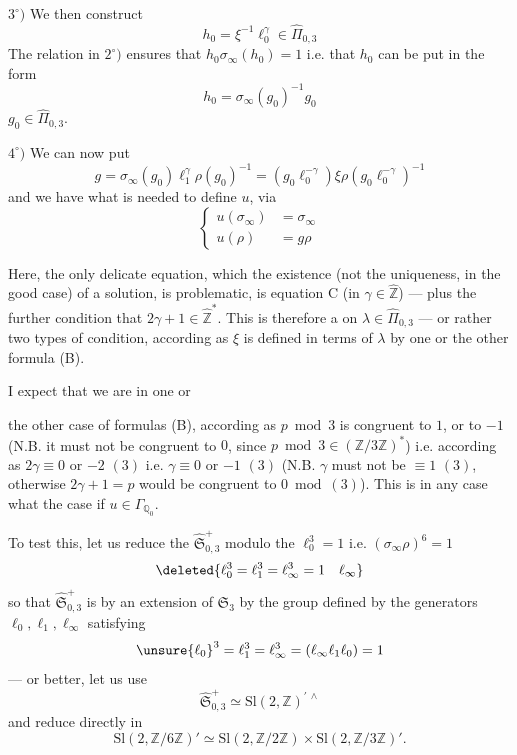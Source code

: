 
$3^\circ)$ We then construct
\[
h_0=\xi^{-1}\ell_0^{\gamma}
\in\widehat{\Pi}_{0,3}
\]
The relation in $2^\circ)$ ensures that $h_0\sigma_\infty(h_0)=1$ i.e.
that $h_0$ can be put in the form
\[
h_0=\sigma_\infty(g_0)^{-1}g_0
\]
 $g_0\in\widehat{\Pi}_{0,3}$.


$4^\circ)$ We can now put
\[
g=\sigma_\infty(g_0)\ell_1^{\gamma}\rho(g_0)^{-1}
=(g_0\ell_0^{-\gamma})\xi
\rho(g_0\ell_0^{-\gamma})^{-1}
\]
and we  have what is needed to define $u$, via
\[
\left\{
\begin{aligned}
u(\sigma_\infty)&=\sigma_\infty\\
u(\rho)&=g\rho
\end{aligned}
\right.
\]

Here, the only delicate equation,  which
the existence (not the uniqueness, in the good case) of a solution, is problematic,
is equation C (in $\gamma\in\widehat{\mathbb Z}$)
--- plus the further condition that $2\gamma+1\in\widehat{\mathbb Z}^{*}$.
This is therefore a 
on $\lambda\in\widehat{\Pi}_{0,3}$ --- or rather two types of condition,
according as $\xi$ is defined in terms of $\lambda$ by
one or the other formula (B).

I expect that we are in one or



the other case of formulas (B), according as $p\bmod 3$ is congruent to $1$, or to $-1$
(N.B. it must not be congruent to $0$, since $p\bmod 3\in(\mathbb Z/3\mathbb Z)^*$)
i.e. according as $2\gamma\equiv 0$ or $-2$ $(3)$ i.e.
$\gamma\equiv 0$ or $-1$ $(3)$
(N.B. $\gamma$ must not be $\equiv 1$ $(3)$,
otherwise $2\gamma+1=p$ would be congruent to $0\bmod(3)$).
This is in any case what  the case if $u\in\Gamma_{\mathbb Q_0}$.

To test this, let us reduce the 
$\widehat{\mathfrak S}_{0,3}^{+}$
modulo the 
$\ell_0^3=1$ i.e. $(\sigma_\infty\rho)^6=1$
\[
\deleted{\ell_0^3=\ell_1^3=\ell_\infty^3=1\quad\ell_\infty}
\]
so that $\widehat{\mathfrak S}_{0,3}^{+}$
is  by an extension of $\mathfrak S_3$
by the group defined by the generators $\ell_0,\ell_1,\ell_\infty$ satisfying
\[
\unsure{\ell_0}^3=\ell_1^3=\ell_\infty^3=(\ell_\infty\ell_1\ell_0)=1
\]
--- or better, let us use
\[
\widehat{\mathfrak S}_{0,3}^{+}
\simeq\mathrm{Sl}(2,\mathbb Z)^{\prime\,\wedge}
\]
and reduce directly in
\[
\mathrm{Sl}(2,\mathbb Z/6\mathbb Z)'
\simeq\mathrm{Sl}(2,\mathbb Z/2\mathbb Z)
\times\mathrm{Sl}(2,\mathbb Z/3\mathbb Z)'.
\]

